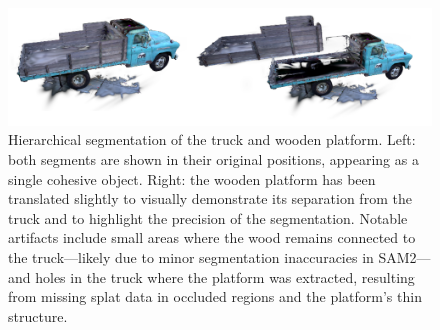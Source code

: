 \documentclass[12pt]{article}
\begin{document}
\begin{figure}[h!]
	\centering
	\includegraphics[width=\textwidth]{Images/woodpair.png}
	\caption{Hierarchical segmentation of the truck and wooden platform. Left: both segments are shown in their original positions, appearing as a single cohesive object. Right: the wooden platform has been translated slightly to visually demonstrate its separation from the truck and to highlight the precision of the segmentation. Notable artifacts include small areas where the wood remains connected to the truck—likely due to minor segmentation inaccuracies in SAM2—and holes in the truck where the platform was extracted, resulting from missing splat data in occluded regions and the platform’s thin structure.
	}
	\label{fig:woodpair}
\end{figure}
\FloatBarrier
\noindent
\end{document}

